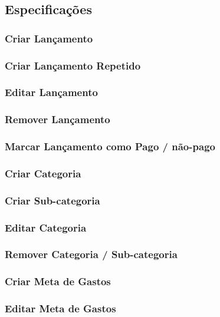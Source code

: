 \documentclass[a4paper]{abnt}
\begin{document}
\subsection{Especificações}

%
%

\subsubsection{Criar Lançamento}
\subsubsection{Criar Lançamento Repetido}
\subsubsection{Editar Lançamento}
\subsubsection{Remover Lançamento}
\subsubsection{Marcar Lançamento como Pago / não-pago}
\subsubsection{Criar Categoria}
\subsubsection{Criar Sub-categoria}
\subsubsection{Editar Categoria}
\subsubsection{Remover Categoria / Sub-categoria}
\subsubsection{Criar Meta de Gastos}
\subsubsection{Editar Meta de Gastos}
\end{document}
